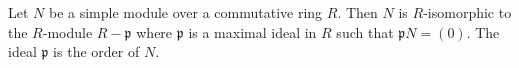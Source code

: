 Let $N$ be a simple module over a commutative ring $R$. Then $N$ is $R$-isomorphic to the $R$-module $R - \mathfrak{p}$ where $\mathfrak{p}$ is a maximal ideal in $R$ such that $\mathfrak{p}N = (0)$. The ideal $\mathfrak{p}$ is the order of $N$.
